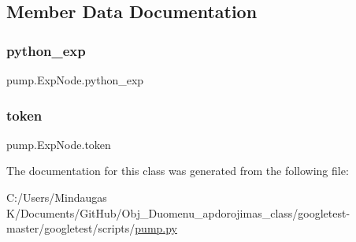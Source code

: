 \subsection{Member Data Documentation}
\mbox{\label{classpump_1_1_exp_node_adccfe4778c2e34f6b2c88118c0f1587f}} 
\subsubsection{\texorpdfstring{python\_exp}{python\_exp}}
{\footnotesize\ttfamily pump.\+Exp\+Node.\+python\+\_\+exp}

\mbox{\label{classpump_1_1_exp_node_ade05a5a32535d717dc5c194569aaf356}} 
\subsubsection{\texorpdfstring{token}{token}}
{\footnotesize\ttfamily pump.\+Exp\+Node.\+token}



The documentation for this class was generated from the following file\+:\begin{DoxyCompactItemize}
\item 
C\+:/\+Users/\+Mindaugas K/\+Documents/\+Git\+Hub/\+Obj\+\_\+\+Duomenu\+\_\+apdorojimas\+\_\+class/googletest-\/master/googletest/scripts/\mbox{\hyperlink{googletest-master_2googletest_2scripts_2pump_8py}{pump.\+py}}\end{DoxyCompactItemize}
